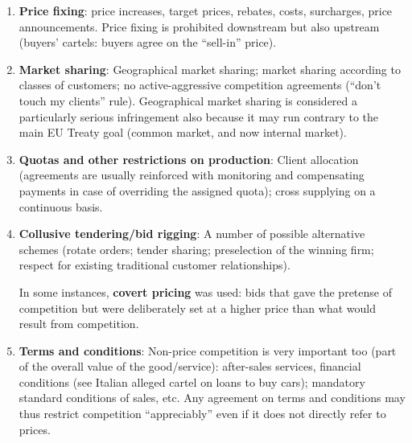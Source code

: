 \newpage

    
    \begin{enumerate}
        \item \textbf{Price fixing}: price increases, target prices, rebates, costs, surcharges, price announcements. Price fixing is prohibited downstream but also upstream (buyers’ cartels: buyers agree on the “sell-in” price).
        
        \item \textbf{Market sharing}: Geographical market sharing; market sharing according to classes of customers; no active-aggressive competition agreements (“don’t touch my clients” rule). Geographical market sharing is considered a particularly serious infringement also because it may run contrary to the main EU Treaty goal (common market, and now internal market).
    
        \item \textbf{Quotas and other restrictions on production}: Client allocation (agreements are usually reinforced with monitoring and compensating payments in case of overriding the assigned quota); cross supplying on a continuous basis.
        
        \item \textbf{Collusive tendering/bid rigging}: A number of possible alternative schemes (rotate orders; tender sharing; preselection of the winning firm; respect for existing traditional customer relationships).
    
        
        In some instances, \textbf{covert pricing} was used: bids that gave the pretense of competition but were deliberately set at a higher price than what would result from competition.

    
        \item \textbf{Terms and conditions}: Non-price competition is very important too (part of the overall value of the good/service): after-sales services, financial conditions (see Italian alleged cartel on loans to buy cars); mandatory standard conditions of sales, etc. Any agreement on terms and conditions may thus restrict competition “appreciably” even if it does not directly refer to prices.
    

\end{enumerate}

